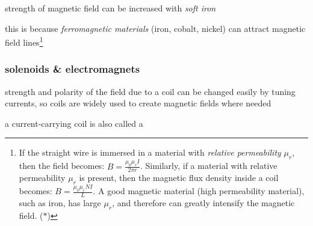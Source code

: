 \cmt strength of magnetic field can be increased with \emph{soft iron}

this is because \emph{ferromagnetic materials} (iron, cobalt, nickel) can attract magnetic field lines\footnote{If the straight wire is immersed in a material with \emph{relative permeability} $\mu_r$, then the field becomes: $B=\frac{\mu_0 \mu_r I}{2\pi r}$. Similarly, if a material with relative permeability $\mu_r$ is present, then the magnetic flux density inside a coil becomes: $B=\frac{\mu_0 \mu_r NI}{L}$. A good magnetic material (high permeability material), such as iron, has large $\mu_r$, and therefore can greatly intensify the magnetic field. ($\ast$)}

\subsubsection{solenoids \& electromagnets}

strength and polarity of the field due to a coil can be changed easily by tuning currents, so coils are widely used to create magnetic fields where needed

a current-carrying coil is also called a 

